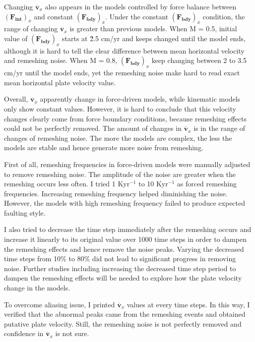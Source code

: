\documentclass[letterpaper,12pt,notitle]{memphisthesis}                     %
\begin{document}
Changing $\overline{\boldsymbol{v}}_{x}$ also appears in the models controlled by force balance between $(\boldsymbol{F_{int}})_x$ and constant $(\boldsymbol{F_{bdy}})_x$. Under the constant $(\boldsymbol{F_{bdy}})_x$ condition, the range of changing $\overline{\boldsymbol{v}}_{x}$ is greater than previous models. When M = 0.5, initial value of $(\boldsymbol{F_{bdy}})_x$ starts at \~ 2.5 cm/yr and keeps changed until the model ends, although it is hard to tell the clear difference between mean horizontal velocity and remeshing noise. When M = 0.8, $(\boldsymbol{F_{bdy}})_x$ keep changing between 2 to 3.5 cm/yr until the model ends, yet the remeshing noise make hard to read exact mean horizontal plate velocity value.

Overall, $\overline{\boldsymbol{v}}_{x}$ apparently change in force-driven models, while kinematic models only show constant values. However, it is hard to conclude that this velocity changes clearly come from force boundary conditions, because remeshing effects could not be perfectly removed. The amount of changes in $\overline{\boldsymbol{v}}_{x}$ is in the range of changes of remeshing noise. The more the models are complex, the less the models are stable and hence generate more noise from remeshing.

First of all, remeshing frequencies in force-driven models were manually adjusted to remove remeshing noise. The amplitude of the noise %
are greater when the remeshing occurs less often. I tried 1 Kyr$^{-1}$ to 10 Kyr$^{-1}$ as forced remeshing frequencies. Increasing remeshing frequency helped diminishing the noise. However, the models with high remeshing frequency failed to produce expected faulting style.

I also tried to decrease the time step immediately after the remeshing occurs and increase it linearly to its original value over 1000 time steps in order to dampen the remeshing effects and hence remove the noise peaks. Varying the decreased time steps from 10\% to 80\% did not lead to significant progress in removing noise. Further studies including increasing the decreased time step period to dampen the remeshing effects will be needed to explore how the plate velocity change in the models. 

To overcome aliasing issue, I printed $\overline{\boldsymbol{v}}_{x}$ values at every time steps. In this way, I verified that the abnormal peaks came from the remeshing events and obtained putative plate velocity. Still, the remeshing noise is not perfectly removed and confidence in $\overline{\boldsymbol{v}}_{x}$ is not sure.
\end{document}
